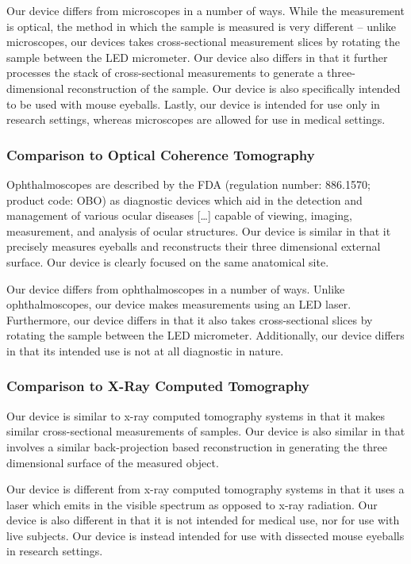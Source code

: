 \documentclass{article}
\begin{document}
Our device differs from microscopes in a number of ways. While the
measurement is optical, the method in which the sample is measured is
very different -- unlike microscopes, our devices takes
cross-sectional measurement slices by rotating the sample between the
LED micrometer. Our device also differs in that it further processes
the stack of cross-sectional measurements to generate a
three-dimensional reconstruction of the sample. Our device is also
specifically intended to be used with mouse eyeballs. Lastly, our
device is intended for use only in research settings, whereas
microscopes are allowed for use in medical settings.

\subsubsection{Comparison to Optical Coherence Tomography}
Ophthalmoscopes are described by the FDA (regulation number: 886.1570;
product code: OBO) as diagnostic devices which aid in the detection
and management of various ocular diseases [\ldots] capable of viewing,
imaging, measurement, and analysis of ocular structures. Our device is
similar in that it precisely measures eyeballs and reconstructs their
three dimensional external surface. Our device is clearly focused on
the same anatomical site.

Our device differs from ophthalmoscopes in a number of ways. Unlike
ophthalmoscopes, our device makes measurements using an LED
laser. Furthermore, our device differs in that it also takes
cross-sectional slices by rotating the sample between the LED
micrometer. Additionally, our device differs in that its intended use
is not at all diagnostic in nature. 

\subsubsection{Comparison to X-Ray Computed Tomography}
Our device is similar to x-ray computed tomography systems in that it
makes similar cross-sectional measurements of samples. Our device is
also similar in that involves a similar back-projection based
reconstruction in generating the three dimensional surface of the
measured object. 

Our device is different from x-ray computed tomography systems in that
it uses a laser which emits in the visible spectrum as opposed to
x-ray radiation. Our device is also different in that it is not
intended for medical use, nor for use with live subjects. Our device is
instead intended for use with dissected mouse eyeballs in research
settings.
\end{document}
